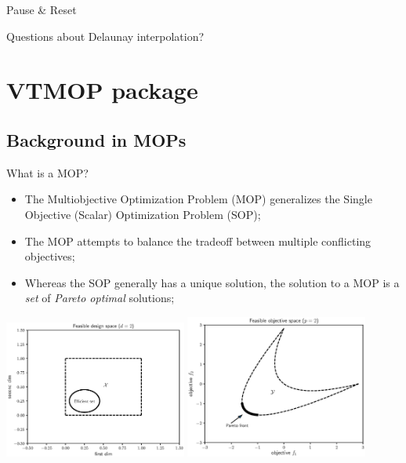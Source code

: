 \documentclass[xcolor=dvipsnames]{beamer}
\begin{document}
\begin{frame}{Pause \& Reset}
\begin{center}
{\huge
Questions about Delaunay interpolation?
}
\end{center}
\end{frame}

\section{VTMOP package}
\subsection{Background in MOPs}
\begin{frame}{What is a MOP?}
\begin{itemize}
\item The Multiobjective Optimization Problem (MOP) generalizes the Single
Objective (Scalar) Optimization Problem (SOP);
\item The MOP attempts to balance the tradeoff between multiple conflicting
objectives;
\item Whereas the SOP generally has a unique solution, the solution to a MOP
is a {\it set} of {\it Pareto optimal} solutions;
\end{itemize}
\begin{center}
\includegraphics[width=0.45\textwidth]{feasible_design.eps}
\includegraphics[width=0.45\textwidth]{convex_pareto.eps}
\end{center}
\end{frame}
\end{document}
